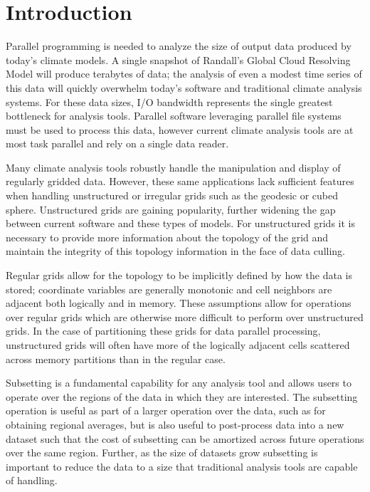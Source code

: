 \section{Introduction}
\label{section:introduction}

Parallel programming is needed to analyze the size of output data produced by
today's climate models.\cite{MODSIM07:LOT}  A single snapshot of Randall's
Global Cloud Resolving Model will produce terabytes of data\cite{GCRM}; the
analysis of even a modest time series of this data will quickly overwhelm
today's software and traditional climate analysis systems.  For these data
sizes, I/O bandwidth represents the single greatest bottleneck for analysis
tools.  Parallel software leveraging parallel file systems must be used to
process this data, however current climate analysis tools are at most task
parallel and rely on a single data reader.\cite{CDAT}\cite{CDO}\cite{NCO}

Many climate analysis tools robustly handle the manipulation and display of
regularly gridded data.  However, these same applications lack sufficient
features when handling unstructured or irregular grids such as the geodesic or
cubed sphere\cite{CUBE}.  Unstructured grids are gaining popularity, further
widening the gap between current software and these types of models.  For
unstructured grids it is necessary to provide more information about the
topology of the grid and maintain the integrity of this topology information
in the face of data culling.

Regular grids allow for the topology to be implicitly defined by how
the data is stored; coordinate variables are generally monotonic and cell
neighbors are adjacent both logically and in memory. These assumptions allow
for operations over regular grids which are otherwise more difficult to
perform over unstructured grids. In the case of partitioning these grids for
data parallel processing, unstructured grids will often have more of the
logically adjacent cells scattered across memory partitions than in the
regular case.

Subsetting is a fundamental capability for any analysis tool and allows users
to operate over the regions of the data in which they are interested. The
subsetting operation is useful as part of a larger operation over the data,
such as for obtaining regional averages, but is also useful to post-process
data into a new dataset such that the cost of subsetting can be amortized
across future operations over the same region. Further, as the size of
datasets grow subsetting is important to reduce the data to a size that
traditional analysis tools are capable of handling. 

